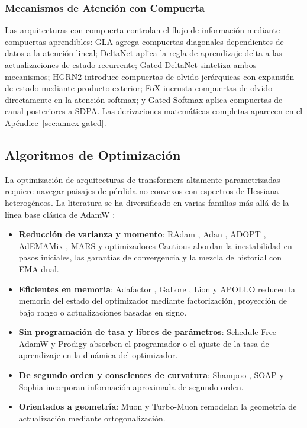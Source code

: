 \documentclass[11pt,a4paper]{article}
\begin{document}
\subsubsection{Mecanismos de Atención con Compuerta}
Las arquitecturas con compuerta controlan el flujo de información mediante compuertas aprendibles: GLA \citep{yang_gla_2023} agrega compuertas diagonales dependientes de datos a la atención lineal; DeltaNet \citep{yang_deltanet_2024} aplica la regla de aprendizaje delta a las actualizaciones de estado recurrente; Gated DeltaNet \citep{yang_gated_deltanet_2024} sintetiza ambos mecanismos; HGRN2 \citep{qin_hgrn2_2024} introduce compuertas de olvido jerárquicas con expansión de estado mediante producto exterior; FoX \citep{lin_forgetting_transformer_2025} incrusta compuertas de olvido directamente en la atención softmax; y Gated Softmax \citep{qiu_gated_attention_2025} aplica compuertas de canal posteriores a SDPA. Las derivaciones matemáticas completas aparecen en el Apéndice~\ref{sec:annex-gated}.

\subsection{Algoritmos de Optimización}

La optimización de arquitecturas de transformers altamente parametrizadas requiere navegar paisajes de pérdida no convexos con espectros de Hessiana heterogéneos. La literatura se ha diversificado en varias familias más allá de la línea base clásica de AdamW \citep{loshchilov_decoupled_2017}:

\begin{itemize}[leftmargin=*]
    \item \textbf{Reducción de varianza y momento}: RAdam \citep{liu_variance_2019}, Adan \citep{xie_adan_2022}, ADOPT \citep{taniguchi_adopt_2024}, AdEMAMix \citep{pagliardini_ademamix_2024}, MARS \citep{yuan_mars_2024} y optimizadores Cautious \citep{liang_cautious_2024} abordan la inestabilidad en pasos iniciales, las garantías de convergencia y la mezcla de historial con EMA dual.
    \item \textbf{Eficientes en memoria}: Adafactor \citep{shazeer_adafactor_2018}, GaLore \citep{zhao_galore_2024}, Lion \citep{chen_symbolic_2023} y APOLLO \citep{zhu2025apollosgdlikememoryadamwlevel} reducen la memoria del estado del optimizador mediante factorización, proyección de bajo rango o actualizaciones basadas en signo.
    \item \textbf{Sin programación de tasa y libres de parámetros}: Schedule-Free AdamW \citep{defazio_road_2024} y Prodigy \citep{mishchenko_prodigy_2023} absorben el programador o el ajuste de la tasa de aprendizaje en la dinámica del optimizador.
    \item \textbf{De segundo orden y conscientes de curvatura}: Shampoo \citep{gupta_shampoo_2018}, SOAP \citep{vyas_soap_2024} y Sophia \citep{liu_sophia_2023} incorporan información aproximada de segundo orden.
    \item \textbf{Orientados a geometría}: Muon \citep{shen_convergence_2025} y Turbo-Muon \citep{boissin_turbo-muon_2025} remodelan la geometría de actualización mediante ortogonalización.
\end{itemize}
\end{document}
